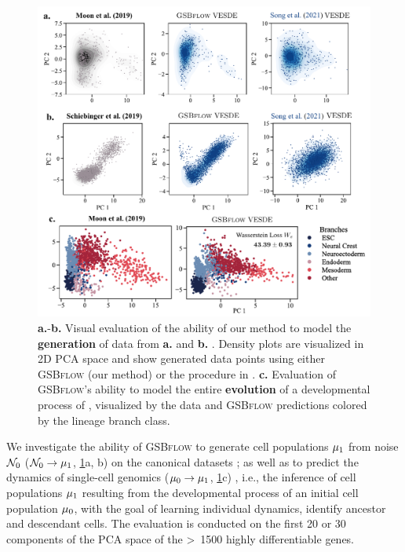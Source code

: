 \begin{figure}
     \centering
     \includegraphics[width=\textwidth]{figures/fig_all_predictions.pdf}
    \caption{\textbf{a.}-\textbf{b.} Visual evaluation of the ability of our method to model the \textbf{generation} of data from \textbf{a.} \citet{moon2019visualizing} and \textbf{b.} \citet{schiebinger2019optimal}. Density plots are visualized in 2D PCA space and show generated data points using either \textsc{GSBflow} (our method) or the procedure in \citet{song2020score}. \textbf{c.} Evaluation of \textsc{GSBflow}'s ability to model the entire \textbf{evolution} of a developmental process of \citet{moon2019visualizing}, visualized by the data and \textsc{GSBflow} predictions colored by the lineage branch class.}
    \label{fig:all_results}
\end{figure}

 We investigate the ability of \textsc{GSBflow} to generate cell populations $\mu_1$ from noise $\mathcal{N}_0$ ($\mathcal{N}_0 \rightarrow \mu_1$, \cref{fig:all_results}a, b) on the canonical datasets \citep{moon2019visualizing, schiebinger2019optimal}; as well as to predict the dynamics of single-cell genomics ($\mu_0 \rightarrow \mu_1$, \cref{fig:all_results}c) \citep{moon2019visualizing}, i.e., the inference of cell populations $\mu_1$ resulting from the developmental process of an initial cell population $\mu_0$, with the goal of learning individual dynamics, identify ancestor and descendant cells. 
The evaluation is conducted on the first 20 or 30 components of the PCA space of the >~1500 highly differentiable genes.

